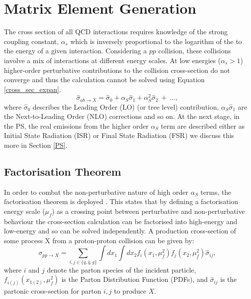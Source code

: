 \section{Matrix Element Generation}
The cross section of all QCD interactions requires knowledge of the strong coupling constant, $\alpha_s$ which is inversely proportional to the logarithm of the to the energy of a given interaction. Considering a $pp$ collision, these collisions involve a mix of interactions at different energy scales. At low energies ($\alpha_s>1$)  higher-order perturbative contributions to the collision cross-section do not converge and thus the calculation cannot be solved using Equation \ref{cross_sec_expan}.
\begin{equation}\label{cross_sec_expan}
    \hat{\sigma}_{ab\rightarrow X}= \hat{\sigma}_0 + \alpha_S \hat{\sigma}_1 +\alpha_S^2 \hat{\sigma}_2\ +\  ...,
\end{equation}
where $\hat{\sigma}_0$ describes the Leading Order (LO) (or tree level) contribution, $\alpha_S \hat{\sigma}_1$ are the Next-to-Leading Order (NLO) corrections and so on. At the next stage, in the PS, the real emissions from the higher order $\alpha_S$ term are described either as Initial State Radiation (ISR) or Final State Radiation (FSR) we discuss this more in Section \ref{PS}.
\subsection{Factorisation Theorem}
In order to combat the non-perturbative nature of high order $\alpha_S$ terms, the factorisation theorem is deployed \cite{factorisation_therome}. This states that by defining a factorisation energy scale ($\mu_f$) as a crossing point between perturbative and non-perturbative behaviour the cross-section calculation can be factorised into high-energy and low-energy and so can be solved independently. A production cross-section of some process X from a proton-proton collision can be given by:
\begin{equation}
    \sigma_{pp\rightarrow X} = \sum_{i,j \in  \{q,\bar{q},g\}} \int dx_1 \int dx_2 f_i(x_1,\mu_f^2)f_j(x_2,\mu_f^2)\hat{\sigma}_{ij},
\end{equation}
where $i$ and $j$ denote the parton species of the incident particle, $f_{i(j)}(x_{1(2)},\mu_f^2)$ is the Parton Distribution Function (PDFs), and $\hat{\sigma}_{ij}$ is the partonic cross-section for parton $i,j$ to produce $X$.
